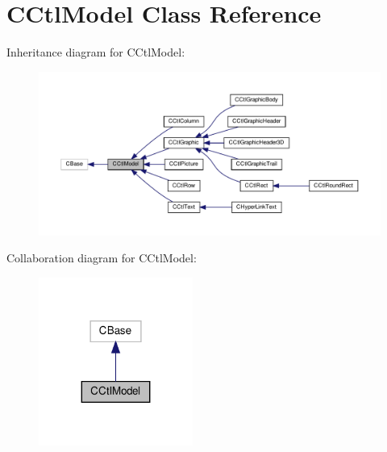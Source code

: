 \hypertarget{classCCtlModel}{}\section{C\+Ctl\+Model Class Reference}
\label{classCCtlModel}


Inheritance diagram for C\+Ctl\+Model\+:
\nopagebreak
\begin{figure}[H]
\begin{center}
\leavevmode
\includegraphics[width=350pt]{classCCtlModel__inherit__graph}
\end{center}
\end{figure}


Collaboration diagram for C\+Ctl\+Model\+:
\nopagebreak
\begin{figure}[H]
\begin{center}
\leavevmode
\includegraphics[width=143pt]{classCCtlModel__coll__graph}
\end{center}
\end{figure}
